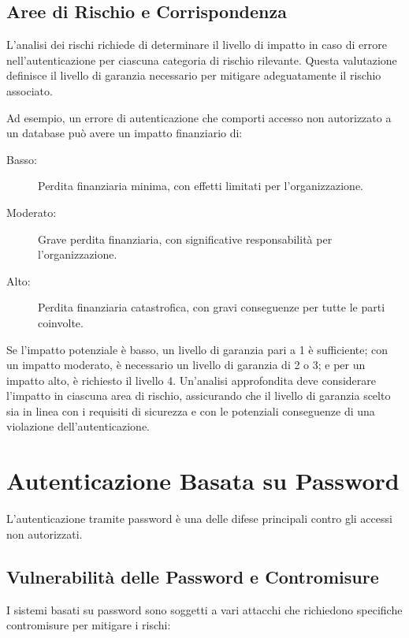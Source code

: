 \subsection{Aree di Rischio e Corrispondenza}

L'analisi dei rischi richiede di determinare il livello di impatto in caso di errore nell'autenticazione per ciascuna categoria di rischio rilevante. Questa valutazione definisce il livello di garanzia necessario per mitigare adeguatamente il rischio associato.

Ad esempio, un errore di autenticazione che comporti accesso non autorizzato a un database può avere un impatto finanziario di:

\begin{description}
    \item[Basso:] Perdita finanziaria minima, con effetti limitati per l'organizzazione.
    \item[Moderato:] Grave perdita finanziaria, con significative responsabilità per l'organizzazione.
    \item[Alto:] Perdita finanziaria catastrofica, con gravi conseguenze per tutte le parti coinvolte.
\end{description}

Se l'impatto potenziale è basso, un livello di garanzia pari a 1 è sufficiente; con un impatto moderato, è necessario un livello di garanzia di 2 o 3; e per un impatto alto, è richiesto il livello 4. Un'analisi approfondita deve considerare l'impatto in ciascuna area di rischio, assicurando che il livello di garanzia scelto sia in linea con i requisiti di sicurezza e con le potenziali conseguenze di una violazione dell'autenticazione.

\section{Autenticazione Basata su Password}

L'autenticazione tramite password è una delle difese principali contro gli accessi non autorizzati.

\subsection{Vulnerabilità delle Password e Contromisure}

I sistemi basati su password sono soggetti a vari attacchi che richiedono specifiche contromisure per mitigare i rischi:


